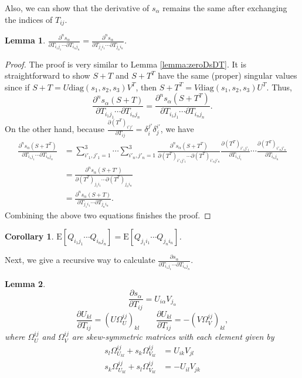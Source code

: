 \documentclass[10pt]{article}
\newtheorem{corollary}{Corollary}
\newtheorem{lemma}{Lemma}
\newcommand{\expect}[1]{\ensuremath{\mathrm{E}\left[ #1 \right]}}
\begin{document}
Also, we can show that the derivative of $s_\alpha$ remains the same after exchanging the indices of $T_{ij}$.
\begin{lemma}
	$\frac{\partial^n s_\alpha}{\partial T_{i_1j_1} \cdots \partial T_{i_nj_n}} = \frac{\partial^n s_\alpha}{\partial T_{j_1i_1} \cdots \partial T_{j_ni_n}}$.
\end{lemma}
\begin{proof}
	The proof is very similar to Lemma \ref{lemma:zeroDsDT}.
	It is straightforward to show $S+T$ and $S+T^T$ have the same (proper) singular values since if $S+T = U\mathrm{diag}(s_1,s_2,s_3)V^T$, then $S+T^T = V\mathrm{diag}(s_1,s_2,s_3)U^T$.
	Thus,
	\begin{equation*}
		\frac{\partial^n s_\alpha(S+T)}{\partial T_{i_1j_1} \cdots \partial T_{i_nj_n}} = \frac{\partial^n s_\alpha(S+T^T)}{\partial T_{i_1j_1} \cdots \partial T_{i_nj_n}}.
	\end{equation*}
	On the other hand, because $\frac{\partial (T^T)_{i'j'}}{\partial T_{ij}} = \delta_i^{j'}\delta_j^{i'}$, we have
	\begin{align*}
		 \frac{\partial^n s_\alpha(S+T^T)}{\partial T_{i_1j_1} \cdots \partial T_{i_nj_n}} &= \sum_{i'_1,j'_1=1}^3 \cdots \sum_{i'_n,j'_n=1}^3 \frac{\partial^n s_\alpha(S+T^T)}{\partial (T^T)_{i'_1j'_1} \cdots \partial (T^T)_{i'_nj'_n}} \frac{\partial (T^T)_{i'_1j'_1}}{\partial T_{i_1j_1}} \cdots \frac{\partial (T^T)_{i'_nj'_n}}{\partial T_{i_nj_n}} \\
		 &= \frac{\partial^n s_\alpha(S+T')}{\partial (T^T)_{j_1i_1} \cdots \partial (T^T)_{j_ni_n}} \\
		 &= \frac{\partial^n s_\alpha(S+T)}{\partial T_{j_1i_1} \cdots \partial T_{j_ni_n}}.
	\end{align*}
	Combining the above two equations finishes the proof.
\end{proof}

\begin{corollary}
	$\expect{Q_{i_1j_1} \cdots Q_{i_nj_n}} = \expect{Q_{j_1i_1} \cdots Q_{j_ni_n}}$.
\end{corollary}

Next, we give a recursive way to calculate $\frac{\partial s_{\alpha}}{\partial T_{i_1j_1} \cdots \partial T_{i_nj_n}}$.
\begin{lemma} \label{lemma:derivSVD}
	\begin{equation}
		\frac{\partial s_\alpha}{\partial T_{ij}} = U_{i\alpha}V_{j_\alpha}
	\end{equation}
	\begin{equation}
		\frac{\partial U_{kl}}{\partial T_{ij}} = \left( U\Omega_U^{ij} \right)_{kl} \qquad
		\frac{\partial U_{kl}}{\partial T_{ij}} = -\left( V\Omega_V^{ij} \right)_{kl},
	\end{equation}
	where $\Omega_U^{ij}$ and $\Omega_V^{ij}$ are skew-symmetric matrices with each element given by
	\begin{align}
		s_l\Omega_{U_{kl}}^{ij} + s_k\Omega_{V_{kl}}^{ij} &= U_{ik}V_{jl} \nonumber \\
		s_k\Omega_{U_{kl}}^{ij} + s_l\Omega_{V_{kl}}^{ij} &= -U_{il}V_{jk}
	\end{align}
\end{lemma}
\end{document}
